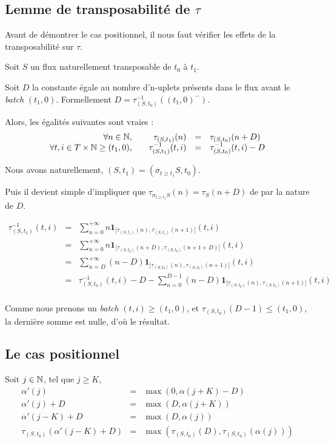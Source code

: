 \subsection{Lemme de transposabilité de $\tau$}
Avant de démontrer le cas positionnel, il nous faut vérifier les effets de la transposabilité sur $\tau$.
\begin{lem}
Soit $S$ un flux naturellement transposable de $t_0$ à $t_1$.

Soit $D$ la constante égale au nombre d'n-uplets présents dans le flux avant le \textit{batch} $(t_1,0)$. Formellement $D=\tau_{(S,t_0)}^{-1} ((t_1,0)^-)$.

Alors, les égalités suivantes sont vraies :
$$\begin{array}{rrcl}
\forall n \in \mathbb{N}, \quad &\tau_{(S,t_1)}(n) & = & \tau_{(S,t_0)}(n+D)\\
\forall t,i \in T\times \mathbb{N} \geq (t_1,0), \quad &\tau_{(S,t_1)}^{-1}(t,i) & = & \tau_{(S,t_0)}^{-1}(t,i) - D
\end{array}$$
\end{lem}

Nous avons naturellement, $(S,t_1) = (\sigma_{t\geq t_1} S,t_0)$. 

Puis il devient simple d'impliquer que $\tau_{\sigma_{t\geq t_1} S}(n) = \tau_{S}(n+D)$ de par la nature de $D$.

$$\begin{array}{rcl}\tau_{(S,t_1)}^{-1}(t,i) &=& \sum_{n=0}^{+\infty} n \mathbf 1_{[\tau_{(S,t_1)}(n),\tau_{(S,t_1)}(n+1)[}(t,i) \\
& =& \displaystyle\sum_{n=0}^{+\infty} n \mathbf 1_{[\tau_{(S,t_0)}(n+D),\tau_{(S,t_0)}(n+1+D)[}(t,i)\\
& =& \displaystyle\sum_{n=D}^{+\infty} (n-D) \mathbf 1_{[\tau_{(S,t_0)}(n),\tau_{(S,t_0)}(n+1)[}(t,i)\\
& = & \tau_{(S,t_0)}^{-1}(t,i) - D - \displaystyle\sum_{n=0}^{D-1} (n-D) \mathbf 1_{[\tau_{(S,t_0)}(n),\tau_{(S,t_0)}(n+1)[}(t,i)\\
\end{array}$$

Comme nous prenons un \textit{batch} $(t,i) \geq (t_1,0)$, et $\tau_{(S,t_0)}(D-1) \leq (t_1,0)$, la dernière somme est nulle, d'où le résultat.
\findemo

\subsection{Le cas positionnel}
Soit $j\in\mathbb{N}$, tel que $j \geq K$, 
\begin{eqnarray*}
\alpha'(j) &=& \max(0, \alpha(j+K)-D)\\
\alpha'(j)+D &=& \max(D, \alpha(j+K))\\
\alpha'(j-K)+D &=& \max(D, \alpha(j))\\
\tau_{(S,t_0)}(\alpha'(j-K)+D) &=& \max(\tau_{(S,t_0)}(D), \tau_{(S,t_0)}(\alpha(j)))
\end{eqnarray*}


